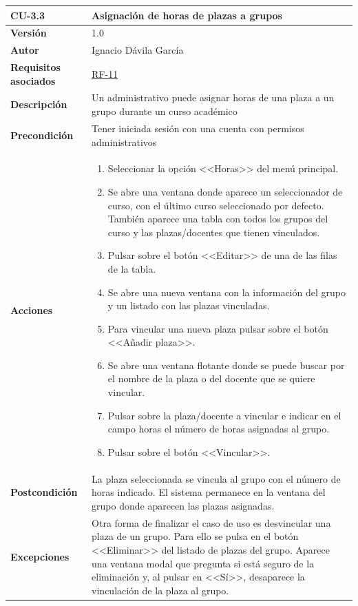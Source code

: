 \begin{table}[p]
\label{table:CU-3.3}
	\centering
	\begin{tabularx}{\linewidth}{ p{} p{} }
		\toprule
		\textbf{CU-3.3}    & \textbf{Asignación de horas de plazas a grupos}\\
		\toprule
		\textbf{Versión}              & 1.0    \\
		\textbf{Autor}                & Ignacio Dávila García \\
		\textbf{Requisitos asociados} & \hyperref[itm:RF11]{RF-11} \\
		\textbf{Descripción}          & Un administrativo puede asignar horas de una plaza a un grupo durante un curso académico \\
		\textbf{Precondición}         & Tener iniciada sesión con una cuenta con permisos administrativos \\
		\textbf{Acciones}             &
		\begin{enumerate}
			\def\labelenumi{\arabic{enumi}.}
			\tightlist
			\item Seleccionar la opción <<Horas>> del menú principal.
			\item Se abre una ventana donde aparece un seleccionador de curso, con el último curso seleccionado por defecto. También aparece una tabla con todos los grupos del curso y las plazas/docentes que tienen vinculados.
			\item Pulsar sobre el botón <<Editar>> de una de las filas de la tabla.
			\item Se abre una nueva ventana con la información del grupo y un listado con las plazas vinculadas.
			\item Para vincular una nueva plaza pulsar sobre el botón <<Añadir plaza>>.
			\item Se abre una ventana flotante donde se puede buscar por el nombre de la plaza o del docente que se quiere vincular.
			\item Pulsar sobre la plaza/docente a vincular e indicar en el campo horas el número de horas asignadas al grupo.
			\item Pulsar sobre el botón <<Vincular>>.
		\end{enumerate}\\
		\textbf{Postcondición}        & La plaza seleccionada se vincula al grupo con el número de horas indicado. El sistema permanece en la ventana del grupo donde aparecen las plazas asignadas. \\
		\textbf{Excepciones}          & Otra forma de finalizar el caso de uso es desvincular una plaza de un grupo. Para ello se pulsa en el botón <<Eliminar>> del listado de plazas del grupo. Aparece una ventana modal que pregunta si está seguro de la eliminación y, al pulsar en <<Sí>>, desaparece la vinculación de la plaza al grupo.

\end{tabularx}
\end{table}
